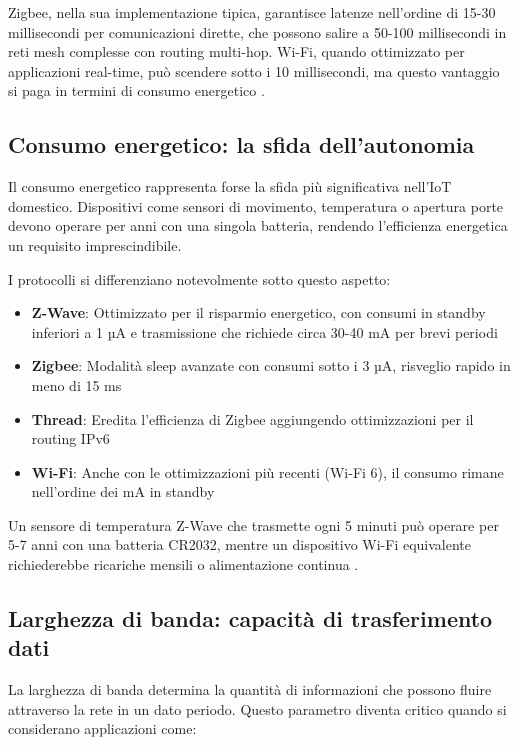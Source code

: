 Zigbee, nella sua implementazione tipica, garantisce latenze nell'ordine di 15-30 millisecondi per comunicazioni dirette, che possono salire a 50-100 millisecondi in reti mesh complesse con routing multi-hop. Wi-Fi, quando ottimizzato per applicazioni real-time, può scendere sotto i 10 millisecondi, ma questo vantaggio si paga in termini di consumo energetico \cite{ZigbeeLatencyStudy}.

\subsection{Consumo energetico: la sfida dell'autonomia}

Il consumo energetico rappresenta forse la sfida più significativa nell'IoT domestico. Dispositivi come sensori di movimento, temperatura o apertura porte devono operare per anni con una singola batteria, rendendo l'efficienza energetica un requisito imprescindibile.

I protocolli si differenziano notevolmente sotto questo aspetto:

\begin{itemize}
    \item \textbf{Z-Wave}: Ottimizzato per il risparmio energetico, con consumi in standby inferiori a 1 µA e trasmissione che richiede circa 30-40 mA per brevi periodi
    \item \textbf{Zigbee}: Modalità sleep avanzate con consumi sotto i 3 µA, risveglio rapido in meno di 15 ms
    \item \textbf{Thread}: Eredita l'efficienza di Zigbee aggiungendo ottimizzazioni per il routing IPv6
    \item \textbf{Wi-Fi}: Anche con le ottimizzazioni più recenti (Wi-Fi 6), il consumo rimane nell'ordine dei mA in standby
\end{itemize}

Un sensore di temperatura Z-Wave che trasmette ogni 5 minuti può operare per 5-7 anni con una batteria CR2032, mentre un dispositivo Wi-Fi equivalente richiederebbe ricariche mensili o alimentazione continua \cite{EnergyEfficientProtocols}.

\subsection{Larghezza di banda: capacità di trasferimento dati}

La larghezza di banda determina la quantità di informazioni che possono fluire attraverso la rete in un dato periodo. Questo parametro diventa critico quando si considerano applicazioni come:

